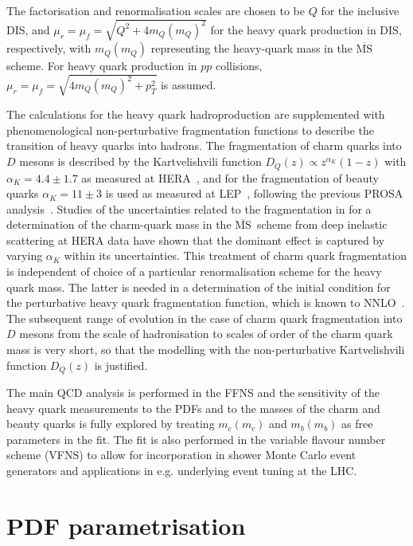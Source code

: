 \documentclass[12pt]{article}
\newcommand{\msbar}{$\overline{\text{MS}}\, $\xspace}
\begin{document}
The factorisation and renormalisation scales are chosen to be $Q$ for the inclusive DIS, and $\mu_r = \mu_f = \sqrt{Q^2 + 4m_Q(m_Q)^2}$ for the heavy quark production in DIS, respectively, with $m_Q(m_Q)$ representing the heavy-quark mass in the \msbar scheme. 
For heavy quark production in $pp$ collisions, $\mu_r = \mu_f = \sqrt{4m_Q(m_Q)^2+p_T^2}$ is assumed. 

The calculations for the heavy quark hadroproduction are supplemented with phenomenological non-perturbative fragmentation 
functions to describe the transition of heavy quarks into hadrons. The fragmentation of charm quarks into $D$ mesons is 
described by the Kartvelishvili function $D_Q(z) \propto z^{\alpha_K}(1-z)$ 
with $\alpha_K = 4.4 \pm 1.7$ as measured at HERA~\cite{Aaron:2008ac,Chekanov:2008ur}, 
and for the fragmentation of beauty quarks $\alpha_K = 11 \pm 3$ is used as measured at LEP~\cite{Nason:1999zj}, following 
the previous PROSA analysis~\cite{Zenaiev:2015rfa}.
Studies of the uncertainties related to the fragmentation in \cite{Alekhin:2012un} 
for a determination of the charm-quark mass in the \msbar scheme from
deep inelastic scattering at HERA data have shown that the dominant effect is
captured by varying $\alpha_K$ within its uncertainties. 
This treatment of charm quark fragmentation is independent of choice of a particular renormalisation scheme for the heavy quark mass. 
The latter is needed in a determination of the initial condition for the perturbative heavy quark fragmentation
function, which is known to NNLO~\cite{Melnikov:2004bm}.
The subsequent range of evolution in the case of charm quark fragmentation
into $D$ mesons from the scale of hadronisation to scales of order of the
charm quark mass is very short, so that the modelling with the non-perturbative Kartvelishvili function $D_Q(z)$ is justified.

The main QCD analysis is performed in the FFNS and the sensitivity of the heavy quark measurements to the PDFs and to the masses 
of the charm and beauty quarks is fully explored by treating $m_c(m_c)$ and $m_b(m_b)$ as free parameters in the fit.
The fit is also performed in the variable flavour number scheme (VFNS) to allow for incorporation in shower Monte Carlo event generators and applications in e.g. 
underlying event tuning at the LHC.


\section{PDF parametrisation}
\label{sec:pdfparam}
\end{document}
